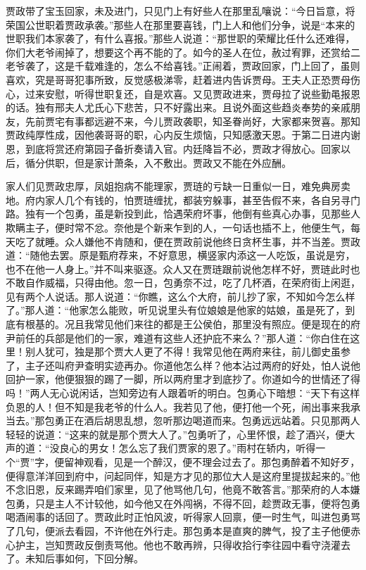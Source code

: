 \begin{parag}
    贾政带了宝玉回家，未及进门，只见门上有好些人在那里乱嚷说：“今日旨意，将荣国公世职着贾政承袭。”那些人在那里要喜钱，门上人和他们分争，说是“本来的世职我们本家袭了，有什么喜报。”那些人说道：“那世职的荣耀比任什么还难得，你们大老爷闹掉了，想要这个再不能的了。如今的圣人在位，赦过宥罪，还赏给二老爷袭了，这是千载难逢的，怎么不给喜钱。”正闹着，贾政回家，门上回了，虽则喜欢，究是哥哥犯事所致，反觉感极涕零，赶着进内告诉贾母。王夫人正恐贾母伤心，过来安慰，听得世职复还，自是欢喜。又见贾政进来，贾母拉了说些勤黾报恩的话。独有邢夫人尤氏心下悲苦，只不好露出来。且说外面这些趋炎奉势的亲戚朋友，先前贾宅有事都远避不来，今儿贾政袭职，知圣眷尚好，大家都来贺喜。那知贾政纯厚性成，因他袭哥哥的职，心内反生烦恼，只知感激天恩。于第二日进内谢恩，到底将赏还府第园子备折奏请入官。内廷降旨不必，贾政才得放心。回家以后，循分供职，但是家计萧条，入不敷出。贾政又不能在外应酬。
\end{parag}


\begin{parag}
    家人们见贾政忠厚，凤姐抱病不能理家，贾琏的亏缺一日重似一日，难免典房卖地。府内家人几个有钱的，怕贾琏缠扰，都装穷躲事，甚至告假不来，各自另寻门路。独有一个包勇，虽是新投到此，恰遇荣府坏事，他倒有些真心办事，见那些人欺瞒主子，便时常不忿。奈他是个新来乍到的人，一句话也插不上，他便生气，每天吃了就睡。众人嫌他不肯随和，便在贾政前说他终日贪杯生事，并不当差。贾政道：“随他去罢。原是甄府荐来，不好意思，横竖家内添这一人吃饭，虽说是穷，也不在他一人身上。”并不叫来驱逐。众人又在贾琏跟前说他怎样不好，贾琏此时也不敢自作威福，只得由他。忽一日，包勇奈不过，吃了几杯酒，在荣府街上闲逛，见有两个人说话。那人说道：“你瞧，这么个大府，前儿抄了家，不知如今怎么样了。”那人道：“他家怎么能败，听见说里头有位娘娘是他家的姑娘，虽是死了，到底有根基的。况且我常见他们来往的都是王公侯伯，那里没有照应。便是现在的府尹前任的兵部是他们的一家，难道有这些人还护庇不来么？”那人道：“你白住在这里！别人犹可，独是那个贾大人更了不得！我常见他在两府来往，前儿御史虽参了，主子还叫府尹查明实迹再办。你道他怎么样？他本沾过两府的好处，怕人说他回护一家，他便狠狠的踢了一脚，所以两府里才到底抄了。你道如今的世情还了得吗！”两人无心说闲话，岂知旁边有人跟着听的明白。包勇心下暗想：“天下有这样负恩的人！但不知是我老爷的什么人。我若见了他，便打他一个死，闹出事来我承当去。”那包勇正在酒后胡思乱想，忽听那边喝道而来。包勇远远站着。只见那两人轻轻的说道：“这来的就是那个贾大人了。”包勇听了，心里怀恨，趁了酒兴，便大声的道：“没良心的男女！怎么忘了我们贾家的恩了。”雨村在轿内，听得一个“贾”字，便留神观看，见是一个醉汉，便不理会过去了。那包勇醉着不知好歹，便得意洋洋回到府中，问起同伴，知是方才见的那位大人是这府里提拔起来的。”他不念旧恩，反来踢弄咱们家里，见了他骂他几句，他竟不敢答言。”那荣府的人本嫌包勇，只是主人不计较他，如今他又在外闯祸，不得不回，趁贾政无事，便将包勇喝酒闹事的话回了。贾政此时正怕风波，听得家人回禀，便一时生气，叫进包勇骂了几句，便派去看园，不许他在外行走。那包勇本是直爽的脾气，投了主子他便赤心护主，岂知贾政反倒责骂他。他也不敢再辨，只得收拾行李往园中看守浇灌去了。未知后事如何，下回分解。
\end{parag}